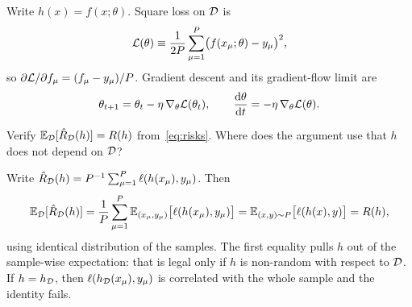 Write $h(x)=f(x;\theta)$. Square loss on $\mathcal{D}$ is
\begin{equation}
  \mathcal{L}(\theta)
  \equiv
  \frac1{2P}\sum_{\mu=1}^{P}\bigl(f(x_\mu;\theta)-y_\mu\bigr)^2,
  \label{eq:sq-loss}
\end{equation}
so $\partial\mathcal{L}/\partial f_\mu=(f_\mu-y_\mu)/P$. Gradient descent and its gradient-flow limit are
\begin{equation}
  \theta_{t+1}=\theta_t-\eta\,\nabla_\theta\mathcal{L}(\theta_t),
  \qquad
  \frac{\mathrm{d} \theta}{\mathrm{d} t}=-\eta\,\nabla_\theta\mathcal{L}(\theta).
  \label{eq:gd-gf}
\end{equation}

\begin{exercise}
Verify $\mathbb{E}_{\mathcal{D}}[\hat R_{\mathcal{D}}(h)]=R(h)$ from~\eqref{eq:risks}. Where does the argument use that $h$ does not depend on $\mathcal{D}$?
\end{exercise}
\begin{solution}
Write $\hat R_{\mathcal{D}}(h)=P^{-1}\sum_{\mu=1}^{P}\ell(h(x_\mu),y_\mu)$. Then
\[
  \mathbb{E}_{\mathcal{D}}[\hat R_{\mathcal{D}}(h)]
  =\frac1P\sum_{\mu=1}^{P}\mathbb{E}_{(x_\mu,y_\mu)}\bigl[\ell(h(x_\mu),y_\mu)\bigr]
  =\mathbb{E}_{(x,y)\sim P}\bigl[\ell(h(x),y)\bigr]
  =R(h),
\]
using identical distribution of the samples. The first equality pulls $h$ out of the sample-wise expectation: that is legal only if $h$ is non-random with respect to $\mathcal{D}$. If $h=h_{\mathcal{D}}$, then $\ell(h_{\mathcal{D}}(x_\mu),y_\mu)$ is correlated with the whole sample and the identity fails.
\end{solution}
